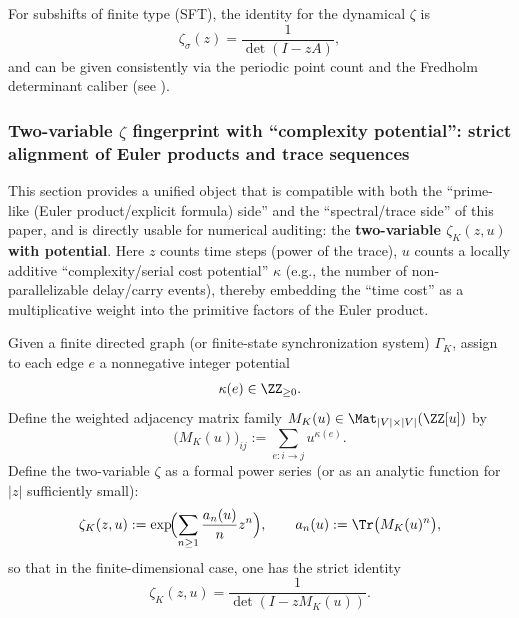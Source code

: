 For subshifts of finite type (SFT), the identity for the dynamical $\zeta$ is
\[
\zeta_\sigma(z)=\frac{1}{\det(I-zA)},
\]
and can be given consistently via the periodic point count and the Fredholm determinant caliber (see \cite{LindMarcus1995,Ruelle1976ZetaExpanding,Ruelle1978Thermodynamic,ParryPollicott1990Zeta}).

\subsubsection{Two-variable \texorpdfstring{$\zeta$}{zeta} fingerprint with ``complexity potential'': strict alignment of Euler products and trace sequences}\label{subsec:zeta-two-variable-kappa}

This section provides a unified object that is compatible with both the ``prime-like (Euler product/explicit formula) side'' and the ``spectral/trace side'' of this paper, and is directly usable for numerical auditing: the \textbf{two-variable \(\zeta_K(z,u)\) with potential}. Here \(z\) counts time steps (power of the trace), \(u\) counts a locally additive ``complexity/serial cost potential'' \(\kappa\) (e.g., the number of non-parallelizable delay/carry events), thereby embedding the ``time cost'' as a multiplicative weight into the primitive factors of the Euler product.

\begin{definition}\label{def:zetaK-zu}
Given a finite directed graph (or finite-state synchronization system) \(\Gamma_K\), assign to each edge \(e\) a nonneg\-ative integer potential
\[
\kappa(e)\in\ZZ_{\ge 0}.
\]
Define the weighted adjacency matrix family \(M_K(u)\in \Mat_{|V|\times |V|}(\ZZ[u])\) by
\[
\bigl(M_K(u)\bigr)_{ij}:=\sum_{e:i\to j} u^{\kappa(e)}.
\]
Define the two-variable \(\zeta\) as a formal power series (or as an analytic function for \(|z|\) sufficiently small):
\begin{equation}\label{eq:zetaK-trace-exp}
\zeta_K(z,u)
:=\exp\!\Bigl(\sum_{n\ge 1}\frac{a_n(u)}{n}z^n\Bigr),
\qquad
a_n(u):=\Tr\bigl(M_K(u)^n\bigr),
\end{equation}
so that in the finite-dimensional case, one has the strict identity
\begin{equation}\label{eq:zetaK-det}
\zeta_K(z,u)=\frac{1}{\det(I-zM_K(u))}.
\end{equation}
\end{definition}

